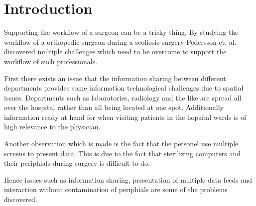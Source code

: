 \section{Introduction}
Supporting the workflow of a surgeon can be a tricky thing.
By studying the workflow of a orthopedic surgeon during a scoliosis surgery Pedersson et. al.\cite{Pederson:2015} discovered multiple challenges which need to be overcome to support the workflow of such professionals.

First there exists an issue that the information sharing between different departments provides some information technological  challenges due to spatial issues.
Departments such as laboratories, radiology and the like are spread all over the hospital rather than all being located at one spot.
Additionally information ready at hand for when visiting patients in the hopsital wards is of high relevance to the physician. 

Another observation which is made is the fact that the personel use multiple screens to present data.
This is due to the fact that sterilizing computers and their periphials during surgery is difficult to do.

Hence issues such as information sharing, presentation of multiple data feeds and interaction without contamination of periphials are some of the problems discovered.
